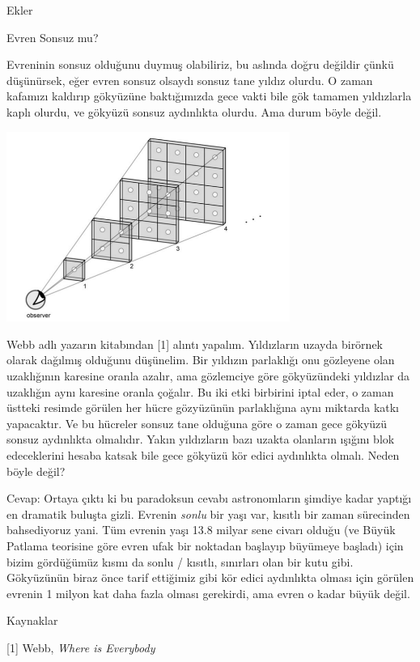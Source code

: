 \documentclass[12pt,fleqn]{article}\usepackage{../../common}
\begin{document}
Ekler

Evren Sonsuz mu?

Evreninin sonsuz olduğunu duymuş olabiliriz, bu aslında doğru değildir
çünkü düşünürsek, eğer evren sonsuz olsaydı sonsuz tane yıldız olurdu. O
zaman kafamızı kaldırıp gökyüzüne baktığımızda gece vakti bile gök tamamen
yıldızlarla kaplı olurdu, ve gökyüzü sonsuz aydınlıkta olurdu. Ama durum
böyle değil.

\includegraphics[width=25em]{universe.png}

Webb adlı yazarın kitabından [1] alıntı yapalım. Yıldızların uzayda
birörnek olarak dağılmış olduğunu düşünelim. Bir yıldızın parlaklığı onu
gözleyene olan uzaklığının karesine oranla azalır, ama gözlemciye göre
gökyüzündeki yıldızlar da uzaklığın aynı karesine oranla çoğalır. Bu iki
etki birbirini iptal eder, o zaman üstteki resimde görülen her hücre
gözyüzünün parlaklığına aynı miktarda katkı yapacaktır. Ve bu hücreler
sonsuz tane olduğuna göre o zaman gece gökyüzü sonsuz aydınlıkta
olmalıdır. Yakın yıldızların bazı uzakta olanların ışığını blok
edeceklerini hesaba katsak bile gece gökyüzü kör edici aydınlıkta
olmalı. Neden böyle değil? 

Cevap: Ortaya çıktı ki bu paradoksun cevabı astronomların şimdiye kadar
yaptığı en dramatik buluşta gizli. Evrenin {\em sonlu} bir yaşı var,
kısıtlı bir zaman sürecinden bahsediyoruz yani. Tüm evrenin yaşı 13.8
milyar sene civarı olduğu (ve Büyük Patlama teorisine göre evren ufak bir
noktadan başlayıp büyümeye başladı) için bizim gördüğümüz kısmı da sonlu /
kısıtlı, sınırları olan bir kutu gibi. Gökyüzünün biraz önce tarif
ettiğimiz gibi kör edici aydınlıkta olması için görülen evrenin 1 milyon
kat daha fazla olması gerekirdi, ama evren o kadar büyük değil.

Kaynaklar 

[1] Webb, {\em Where is Everybody}
\end{document}
